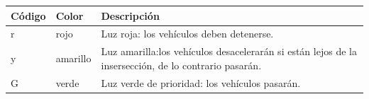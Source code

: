 \begin{longtable}[]{@{}lll@{}}
\toprule
\begin{minipage}[b]{0.05\columnwidth}\raggedright
Código\strut
\end{minipage} & \begin{minipage}[b]{0.06\columnwidth}\raggedright
Color\strut
\end{minipage} & \begin{minipage}[b]{0.80\columnwidth}\raggedright
Descripción\strut
\end{minipage}\tabularnewline
\midrule
\endhead
\begin{minipage}[t]{0.05\columnwidth}\raggedright
r\strut
\end{minipage} & \begin{minipage}[t]{0.06\columnwidth}\raggedright
rojo\strut
\end{minipage} & \begin{minipage}[t]{0.80\columnwidth}\raggedright
Luz roja: los vehículos deben detenerse.\strut
\end{minipage}\tabularnewline
\begin{minipage}[t]{0.05\columnwidth}\raggedright
y\strut
\end{minipage} & \begin{minipage}[t]{0.06\columnwidth}\raggedright
amarillo\strut
\end{minipage} & \begin{minipage}[t]{0.80\columnwidth}\raggedright
Luz amarilla:los vehículos desacelerarán si están lejos de la
insersección, de lo contrario pasarán.\strut
\end{minipage}\tabularnewline
\begin{minipage}[t]{0.05\columnwidth}\raggedright
G\strut
\end{minipage} & \begin{minipage}[t]{0.06\columnwidth}\raggedright
verde\strut
\end{minipage} & \begin{minipage}[t]{0.80\columnwidth}\raggedright
Luz verde de prioridad: los vehículos pasarán.\strut
\end{minipage}\tabularnewline
\bottomrule
\end{longtable}

